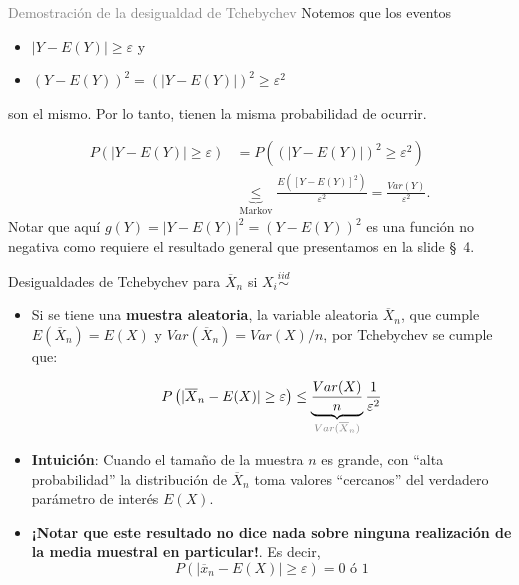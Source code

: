 \documentclass{beamer}
\theoremstyle{definition}
\begin{document}
\begin{frame}{\textcolor{gray}{Demostraci\'on de la desigualdad de Tchebychev}} \small
Notemos que los eventos
\begin{itemize}
    \item $|Y - E(Y)| \geq \varepsilon$ \qquad y 
    \item $(Y - E(Y))^2=(|Y - E(Y)|)^{2} \geq \varepsilon^{2}$
\end{itemize}
son el mismo. Por lo tanto, tienen la misma probabilidad de ocurrir.

    \begin{align*}
      P\left( |Y - E(Y)| \geq \varepsilon \right) 
      &= P\left( (|Y - E(Y)|)^{2} \geq \varepsilon^{2} \right) \\
      &\underbrace{\leq}_{\text{Markov}} \frac{E\left( \left[ Y - E(Y)\right]^{2} \right)}{\varepsilon^{2}}= 
        \frac{Var(Y)}{\varepsilon^{2}}.
    \end{align*}
Notar que aquí $g(Y) = |Y - E(Y)|^2=(Y - E(Y))^2$ es una función no negativa como requiere el resultado general que presentamos en la slide \S~4.
\end{frame} 

\begin{frame}{\color{rosee}Desigualdades de Tchebychev para $\overline{X}_{n}$ si $X_i \stackrel{iid}{\sim}$}\small
\begin{itemize}

    \item Si se tiene una \textbf{muestra aleatoria}, la variable aleatoria $\overline{X}_{n}$, que cumple $E(\overline{X}_{n})=E(X)$ y $Var(\overline{X}_{n})=Var(X)/n$, por Tchebychev se cumple que:\medskip

    \begin{equation*}
      P\left( \vert \overline{X}_{n} -E(X) \vert\geq \varepsilon \right)
      \leq \underbrace{\frac{Var(X)}{n}}_{\textcolor{gray}{Var(\overline{X}_{n})}} \frac{1}{\varepsilon^{2}}
    \end{equation*}

   \item \textbf{Intuición}: Cuando el tamaño de la muestra $n$ es grande, con ``alta probabilidad'' la distribución de $\overline{X}_{n}$ toma valores ``cercanos'' del verdadero parámetro de interés $E(X)$. \medskip
\item \textbf{¡Notar que este resultado no dice nada sobre ninguna realización de la media muestral en particular!}. Es decir, 
\[ P\left( \vert \overline{x}_{n} -E(X) \vert\geq \varepsilon \right)= 0 \text{ \'o } 1\]
\end{itemize}

\end{frame}
\end{document}
